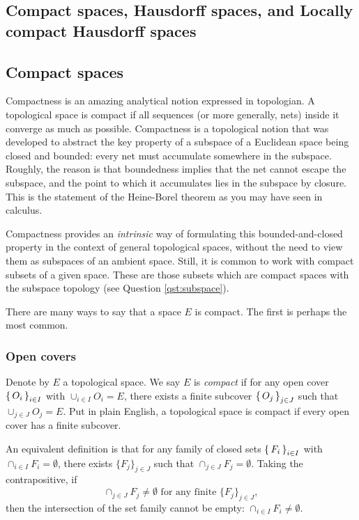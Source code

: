 \begin{center}
  \section{Compact spaces, Hausdorff spaces, and Locally compact Hausdorff spaces}
\end{center}

\subsection{Compact spaces}

Compactness is an amazing analytical notion expressed in 
topologian.
A topological space 
is compact if all sequences (or more generally, nets) inside it converge as much as possible.
Compactness is a topological notion that was developed to abstract the key property of a subspace of a Euclidean space being closed and bounded: every net must accumulate somewhere in the subspace.
Roughly, the reason is that boundedness implies that
the net cannot escape the subspace, and the point to which it accumulates lies in the subspace by closure. 
This is the statement of the Heine-Borel theorem as you may have seen in calculus.



Compactness provides an \textit{intrinsic} way of formulating this bounded-and-closed property in the context of general topological spaces, without the need to view them as subspaces of an ambient space.
Still, it is common to work with compact subsets of a given space. These are those subsets which are compact spaces with the subspace topology 
(see Question \ref{qst:subspace}).


There are many ways to say that a space $E$ is compact.
The first is perhaps the most common.

\subsubsection{Open covers}

Denote by $E$ a topological space. We say $E$ is \textit{compact} if for any open cover $\set{O_i}_{i \in I}$ with
$\cup_{i \in I} O_i = E$, there exists a finite subcover
$\set{O_j}_{j \in J}$ such that 
$\cup_{j \in J} O_j = E$.
Put in plain English,
a topological space is compact if every open cover has a finite subcover.




An equivalent definition is that for any family of closed sets $\set{F_i}_{i \in I}$ with $\cap_{i \in I} F_i = \emptyset$, there exists $\{F_j\}_{j \in J}$ such that
$\cap_{j \in J} F_j = \emptyset$.
Taking the contrapositive,
if  
\begin{equation}
\cap_{j \in J} F_j \neq \emptyset \text{ for any finite }
\{F_j\}_{j \in J},  
\end{equation}
then the intersection of the set family  
cannot be empty:
$\cap_{i \in I} F_i \neq \emptyset$.

